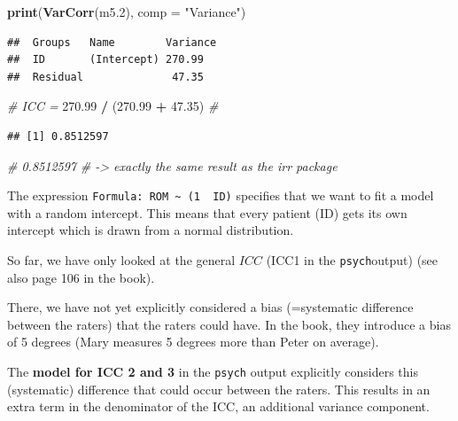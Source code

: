 \documentclass[
]{book}
\newenvironment{Shaded}{\begin{snugshade}}{\end{snugshade}}
\newcommand{\AttributeTok}[1]{\textcolor[rgb]{0.13,0.29,0.53}{#1}}
\newcommand{\CommentTok}[1]{\textcolor[rgb]{0.56,0.35,0.01}{\textit{#1}}}
\newcommand{\FloatTok}[1]{\textcolor[rgb]{0.00,0.00,0.81}{#1}}
\newcommand{\FunctionTok}[1]{\textcolor[rgb]{0.13,0.29,0.53}{\textbf{#1}}}
\newcommand{\NormalTok}[1]{#1}
\newcommand{\SpecialCharTok}[1]{\textcolor[rgb]{0.81,0.36,0.00}{\textbf{#1}}}
\newcommand{\StringTok}[1]{\textcolor[rgb]{0.31,0.60,0.02}{#1}}
\begin{document}
\begin{Shaded}
\begin{Highlighting}[]
\FunctionTok{print}\NormalTok{(}\FunctionTok{VarCorr}\NormalTok{(m5}\FloatTok{.2}\NormalTok{), }\AttributeTok{comp =} \StringTok{"Variance"}\NormalTok{)}
\end{Highlighting}
\end{Shaded}

\begin{verbatim}
##  Groups   Name        Variance
##  ID       (Intercept) 270.99  
##  Residual              47.35
\end{verbatim}

\begin{Shaded}
\begin{Highlighting}[]
\CommentTok{\# ICC = }
\FloatTok{270.99} \SpecialCharTok{/}\NormalTok{ (}\FloatTok{270.99} \SpecialCharTok{+} \FloatTok{47.35}\NormalTok{) }\CommentTok{\# }
\end{Highlighting}
\end{Shaded}

\begin{verbatim}
## [1] 0.8512597
\end{verbatim}

\begin{Shaded}
\begin{Highlighting}[]
\CommentTok{\# 0.8512597}
\CommentTok{\# {-}\textgreater{} exactly the same result as the irr package}
\end{Highlighting}
\end{Shaded}

The expression \texttt{Formula:\ ROM\ \textasciitilde{}\ (1\ \textbar{}\ ID)} specifies that we want to fit a model with
a random intercept. This means that every patient (ID) gets its own intercept
which is drawn from a normal distribution.

So far, we have only looked at the general \textbf{\(ICC\)} (ICC1 in the \texttt{psych}output)
(see also page 106 in the book).

There, we have not yet explicitly considered a bias (=systematic difference
between the raters) that the raters could have. In the book,
they introduce a bias of 5 degrees (Mary measures 5 degrees more than Peter on average).

The \textbf{model for ICC 2 and 3} in the \texttt{psych} output explicitly considers this
(systematic) difference that could occur between the raters.
This results in an extra term in the denominator
of the ICC, an additional variance component.
\end{document}
